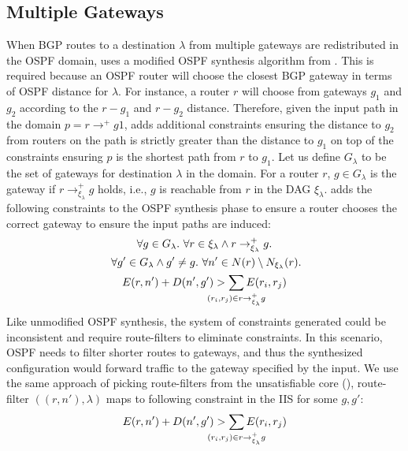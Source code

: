 \subsection{Multiple Gateways}
When BGP routes to a destination $\lambda$ 
from multiple gateways are redistributed in
the OSPF domain, \name uses a modified OSPF synthesis
algorithm from . This is 
required because an OSPF router will choose
the closest BGP gateway in terms of OSPF distance 
for $\lambda$. For instance, a router $r$ will choose
from gateways $g_1$ and $g_2$ according to the $r-g_1$
and $r-g_2$ distance. Therefore, given the input path in
the domain $p=r \rightarrow^+ g1$, \name adds additional
constraints ensuring the distance to $g_2$ from routers
on the path is strictly
greater than the distance to $g_1$ 
on top of the constraints ensuring
$p$ is the shortest path from $r$ to $g_1$. 
Let us define $G_\lambda$ to be the set of gateways
for destination $\lambda$ in the domain. For 
a router $r$, $g \in G_\lambda$ is the gateway if
$r \rightarrow^+_{\xi_{\lambda}} g$ holds, i.e., $g$ 
is reachable from $r$ in the DAG $\xi_{\lambda}$.  
\name adds the following constraints to the 
OSPF synthesis phase to ensure a router
chooses the correct gateway to ensure the input 
paths are induced: 
\begin{multline} \label{eq:gateway}
\forall g \in G_{\lambda}.~\forall r \in \xi_\lambda 
\wedge r \rightarrow^+_{\xi_{\lambda}} g. \\
~\forall g' \in G_{\lambda} \wedge g' \not= g. 
~\forall n' \in N(r) \setminus N_{\xi_\lambda}(r). \\
E(r, n') + D(n', g') > \sum_{\mathclap{\substack{(r_i,r_j) \in r \rightarrow^+_{\xi_{\lambda}} g }}} 
E(r_i, r_j) 
\end{multline}
Like unmodified OSPF synthesis, the system of
constraints generated could be inconsistent and require
route-filters to eliminate constraints. In this scenario,
OSPF needs to filter shorter routes to gateways, and
thus the synthesized configuration would forward traffic to
the gateway specified by the input. We use the same 
approach of picking route-filters from the unsatisfiable core
(), route-filter $((r, n'), \lambda)$
maps to following constraint in the IIS for some $g,g'$: 
\begin{equation}
E(r, n') + D(n', g') > \sum_{\mathclap{\substack{(r_i,r_j) \in r \rightarrow^+_{\xi_{\lambda}} g }}} 
E(r_i, r_j) 
\end{equation}

